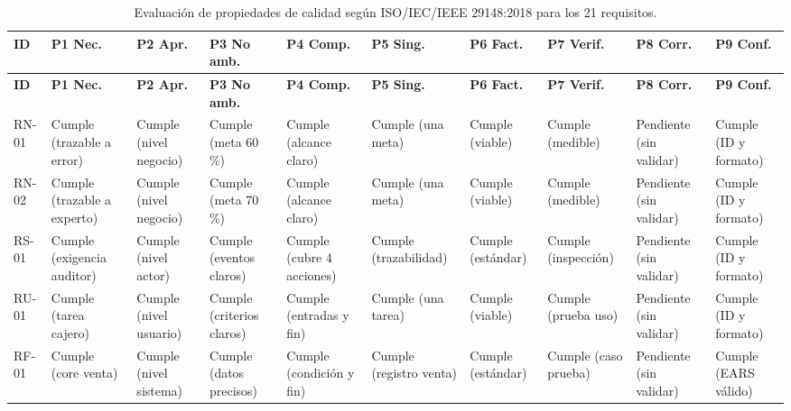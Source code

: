 \documentclass[onecolumn,12pt,a4paper]{IEEEtran}
\begin{document}
	\begingroup
\scriptsize
\setlength{\tabcolsep}{2pt}
\begin{longtable}{>{\raggedright\arraybackslash}p{1.2cm} >{\raggedright\arraybackslash}p{1.2cm} >{\raggedright\arraybackslash}p{1.2cm} >{\raggedright\arraybackslash}p{1.3cm} >{\raggedright\arraybackslash}p{1.3cm} >{\raggedright\arraybackslash}p{1.2cm} >{\raggedright\arraybackslash}p{1.3cm} >{\raggedright\arraybackslash}p{1.3cm} >{\raggedright\arraybackslash}p{1.5cm} >{\raggedright\arraybackslash}p{1.2cm}}
		\caption{Evaluaci\'on de propiedades de calidad seg\'un ISO/IEC/IEEE 29148:2018 para los 21 requisitos.}
		\label{tab:eval_propiedades}\\
		\toprule
		\textbf{ID} & \textbf{P1 Nec.} & \textbf{P2 Apr.} & \textbf{P3 No amb.} & \textbf{P4 Comp.} & \textbf{P5 Sing.} & \textbf{P6 Fact.} & \textbf{P7 Verif.} & \textbf{P8 Corr.} & \textbf{P9 Conf.} \\
		\midrule
		\endfirsthead
		\toprule
		\textbf{ID} & \textbf{P1 Nec.} & \textbf{P2 Apr.} & \textbf{P3 No amb.} & \textbf{P4 Comp.} & \textbf{P5 Sing.} & \textbf{P6 Fact.} & \textbf{P7 Verif.} & \textbf{P8 Corr.} & \textbf{P9 Conf.} \\
		\midrule
		\endhead
		\bottomrule
		\endfoot
		RN-01 & Cumple (trazable a error) & Cumple (nivel negocio) & Cumple (meta 60\,\%) & Cumple (alcance claro) & Cumple (una meta) & Cumple (viable) & Cumple (medible) & Pendiente (sin validar) & Cumple (ID y formato) \\
		\midrule
		RN-02 & Cumple (trazable a experto) & Cumple (nivel negocio) & Cumple (meta 70\,\%) & Cumple (alcance claro) & Cumple (una meta) & Cumple (viable) & Cumple (medible) & Pendiente (sin validar) & Cumple (ID y formato) \\
		\midrule
		RS-01 & Cumple (exigencia auditor) & Cumple (nivel actor) & Cumple (eventos claros) & Cumple (cubre 4 acciones) & Cumple (trazabilidad) & Cumple (est\'andar) & Cumple (inspecci\'on) & Pendiente (sin validar) & Cumple (ID y formato) \\
		\midrule
		RU-01 & Cumple (tarea cajero) & Cumple (nivel usuario) & Cumple (criterios claros) & Cumple (entradas y fin) & Cumple (una tarea) & Cumple (viable) & Cumple (prueba uso) & Pendiente (sin validar) & Cumple (ID y formato) \\
		\midrule
		RF-01 & Cumple (core venta) & Cumple (nivel sistema) & Cumple (datos precisos) & Cumple (condici\'on y fin) & Cumple (registro venta) & Cumple (est\'andar) & Cumple (caso prueba) & Pendiente (sin validar) & Cumple (EARS v\'alido) \\

\end{longtable}
\end{document}
